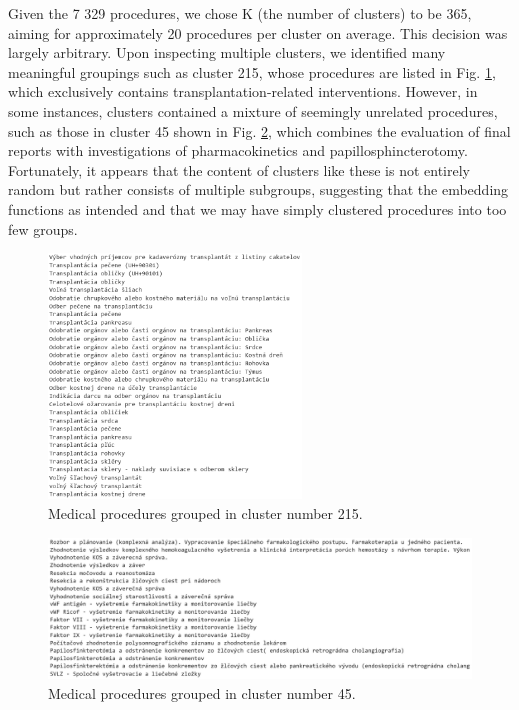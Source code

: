 Given the 7 329 procedures, we chose K (the number of clusters) to be 365, aiming for approximately 20 procedures per cluster on average. This decision was largely arbitrary. Upon inspecting multiple clusters, we identified many meaningful groupings such as cluster 215, whose procedures are listed in Fig. \ref{fig:G215}, which exclusively contains transplantation-related interventions. However, in some instances, clusters contained a mixture of seemingly unrelated procedures, such as those in cluster 45 shown in Fig. \ref{fig:G45}, which combines the evaluation of final reports with investigations of pharmacokinetics and papillosphincterotomy. Fortunately, it appears that the content of clusters like these is not entirely random but rather consists of multiple subgroups, suggesting that the embedding functions as intended and that we may have simply clustered procedures into too few groups.

\begin{figure}[!h]
	\centering
	
	\includegraphics[width=0.6\textwidth]{images/G215.png}
	
	\caption{Medical procedures grouped in cluster number 215.}
	\label{fig:G215}
\end{figure}

\begin{figure}[!h]
	\centering
	
	\includegraphics[width=1.1\textwidth]{images/G45.png}
	
	\caption{Medical procedures grouped in cluster number 45.}
	\label{fig:G45}
\end{figure}